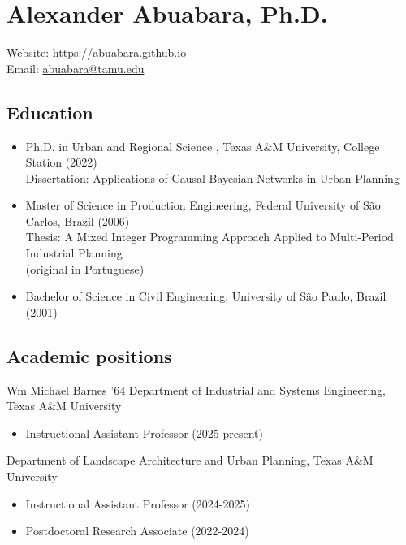\documentclass[11pt]{article}
\begin{document}

\section*{Alexander Abuabara, Ph.D.}
Website: \url{https://abuabara.github.io}\\[1pt]
Email: \href{mailto:abuabara@tamu.edu}{abuabara@tamu.edu}

\subsection*{Education}
\begin{itemize}[leftmargin=20pt]
\item Ph.D. in Urban and Regional Science , Texas A\&M University, College Station (2022)\\[1pt]
      Dissertation: Applications of Causal Bayesian Networks in Urban Planning
\item Master of Science in Production Engineering, Federal University of São Carlos, Brazil (2006)\\[1pt]
      Thesis: A Mixed Integer Programming Approach Applied to Multi-Period Industrial Planning\\
      {\small (original in Portuguese)}
\item Bachelor of Science in Civil Engineering, University of São Paulo, Brazil (2001)
\end{itemize}

\subsection*{Academic positions}
Wm Michael Barnes ’64 Department of Industrial and Systems Engineering, Texas A\&M University
\begin{itemize}[leftmargin=20pt]
\item Instructional Assistant Professor (2025-present)
\end{itemize}

\vspace{3pt}

Department of Landscape Architecture and Urban Planning, Texas A\&M University
\begin{itemize}[leftmargin=20pt]
\item Instructional Assistant Professor (2024-2025)
\item Postdoctoral Research Associate (2022-2024)
\end{itemize}
\end{document}
